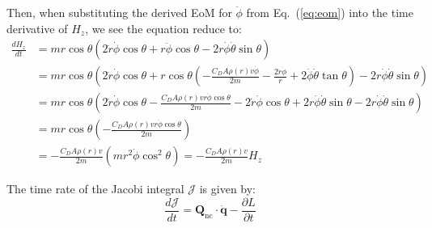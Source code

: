 \documentclass[titlepage]{article}
\begin{document}
Then, when substituting the derived EoM for $\ddot{\phi}$ from Eq.~(\ref{eq:eom}) into the time derivative of $H_z$, we see the equation reduce to:
\begin{equation}
	\begin{split}
		\frac{dH_z}{dt}&=mr\cos\theta\left(2\dot{r}\dot{\phi}\cos\theta+r\ddot{\phi}\cos\theta-2r\dot{\phi}\dot{\theta}\sin\theta\right) \\
		&=mr\cos\theta\left(2\dot{r}\dot{\phi}\cos\theta+r\cos\theta\left(-\frac{C_DA\rho(r)v\dot{\phi}}{2m}-\frac{2\dot{r}\dot{\phi}}{r}+2\dot{\phi}\dot{\theta}\tan\theta\right)-2r\dot{\phi}\dot{\theta}\sin\theta\right) \\
		&=mr\cos\theta\left(2\dot{r}\dot{\phi}\cos\theta-\frac{C_DA\rho(r)vr\dot{\phi}\cos\theta}{2m}-2\dot{r}\dot{\phi}\cos\theta+2r\dot{\phi}\dot{\theta}\sin\theta-2r\dot{\phi}\dot{\theta}\sin\theta\right) \\
		&=mr\cos\theta\left(-\frac{C_DA\rho(r)vr\dot{\phi}\cos\theta}{2m}\right) \\
		&=-\frac{C_DA\rho(r)v}{2m}\left(mr^2\dot{\phi}\cos^2\theta\right)=-\frac{C_DA\rho(r)v}{2m}H_z
	\end{split}
\end{equation}

The time rate of the Jacobi integral $\mathcal{J}$ is given by:
\begin{equation}
	\frac{d\mathcal{J}}{dt}=\boldsymbol{Q}_{\text{nc}}\cdot\dot{\boldsymbol{q}}-\frac{\partial L}{\partial t}
	\label{eq:jacobirate}
\end{equation}
\end{document}
